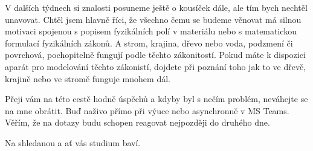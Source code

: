 \documentclass[12pt]{article}
\begin{document}
V dalších týdnech si znalosti posuneme ještě o kousíček dále, ale tím bych nechtěl unavovat. Chtěl jsem hlavně říci, že všechno čemu se budeme věnovat má silnou motivaci spojenou s popisem fyzikálních polí v materiálu nebo s matematickou formulací fyzikálních zákonů. A strom, krajina, dřevo nebo voda, podzmení či povrchová, pochopitelně fungují podle těchto zákonitostí. Pokud máte k dispozici aparát pro modelování těchto zákonistí, dojdete při poznání toho jak to ve dřevě, krajině nebo ve stromě funguje mnohem dál.

Přeji vám na této cestě hodně úspěchů a kdyby byl s nečím problém, neváhejte se na mne obrátit. Buď naživo přímo při výuce nebo asynchronně v MS Teams. Věřím, že na dotazy budu schopen reagovat nejpozději do druhého dne.

Na shledanou a ať vás studium baví.
\end{document}
